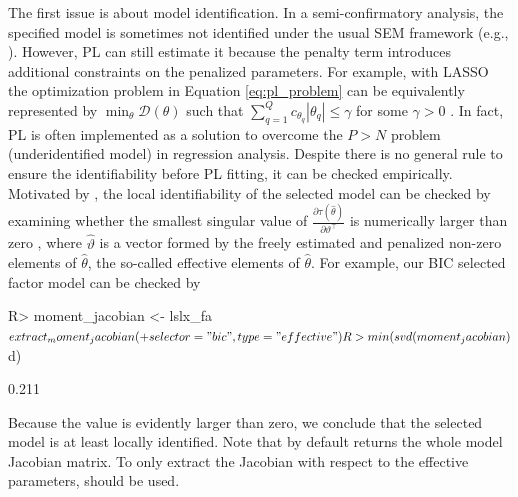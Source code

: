 \documentclass[nojss]{jss}
\begin{document}
The first issue is about model identification. In a semi-confirmatory analysis, the specified model is sometimes not identified under the usual SEM framework (e.g., ). However, PL can still estimate it because the penalty term introduces additional constraints on the penalized parameters. For example, with LASSO the optimization problem in Equation \ref{eq:pl_problem} can be equivalently represented by $\min_{\theta} \mathcal{D}(\theta)$ such that $\sum_{q=1}^Q c_{\theta_q}|\theta_q| \leq \gamma$ for some $\gamma>0$ \citep[see][]{Tibshirani1996}. In fact, PL is often implemented as a solution to overcome the $P>N$ problem (underidentified model) in regression analysis. Despite there is no general rule to ensure the identifiability before PL fitting, it can be checked empirically. Motivated by \cite{Shapiro1983}, the local identifiability of the selected model can be checked by examining whether the smallest singular value of $\frac{\partial \tau(\hat{\theta})}{\partial \vartheta^\top}$ is numerically larger than zero \citep[see also][]{Huang}, where $\hat{\vartheta}$ is a vector formed by the freely estimated and penalized non-zero elements of $\hat{\theta}$, the so-called effective elements of $\hat{\theta}$. For example, our BIC selected factor model can be checked by
\begin{Schunk}
\begin{Sinput}
R> moment_jacobian <- lslx_fa$extract_moment_jacobian(
+    selector = "bic", type = "effective")
R> min(svd(moment_jacobian)$d)
\end{Sinput}
\begin{Soutput}
[1] 0.211
\end{Soutput}
\end{Schunk}
Because the value is evidently larger than zero, we conclude that the selected model is at least locally identified. Note that by default  returns the whole model Jacobian matrix. To only extract the Jacobian with respect to the effective parameters,  should be used. 
\end{document}
